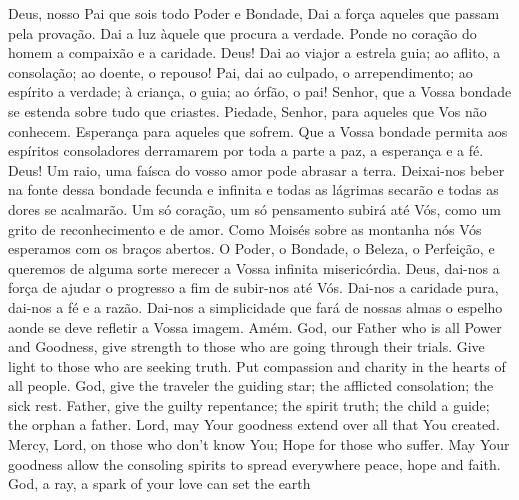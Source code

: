   \beginverse
    Deus, nosso Pai que sois todo Poder e Bondade, Dai
    a força aqueles que passam pela provação.
    \parspace
    Dai a luz àquele que procura a verdade.
    \parspace
    Ponde no coração do homem a compaixão e a caridade.
    \parspace
    Deus! Dai ao viajor a estrela guia; ao aflito,
    a consolação; ao doente, o repouso!
    \parspace
    Pai, dai ao culpado, o arrependimento; ao espírito
    a verdade; à criança, o guia; ao órfão, o pai!
    \parspace
    Senhor, que a Vossa bondade se estenda sobre tudo
    que criastes.
    \parspace
    Piedade, Senhor, para aqueles que Vos não conhecem.
    \parspace
    Esperança para aqueles que sofrem.
    \parspace
    Que a Vossa bondade permita aos espíritos
    consoladores derramarem por toda a parte a paz, a
    esperança e a fé.
    \parspace
    Deus! Um raio, uma faísca do vosso amor pode abrasar
    a terra.
    \parspace
    Deixai-nos beber na fonte dessa bondade fecunda
    e infinita e todas as lágrimas secarão e todas as
    dores se acalmarão.
    \parspace
    Um só coração, um só pensamento subirá até Vós,
    como um grito de reconhecimento e de amor.
    \parspace
    Como Moisés sobre as montanha nós Vós esperamos
    com os braços abertos.
    \parspace
    O Poder, o Bondade, o Beleza, o Perfeição, e
    queremos de alguma sorte merecer a Vossa infinita
    misericórdia.
    \parspace
    Deus, dai-nos a força de ajudar o progresso a fim
    de subir-nos até Vós.
    \parspace
    Dai-nos a caridade pura, dai-nos a fé e a razão.
    \parspace
    Dai-nos a simplicidade que fará de nossas almas o
    espelho aonde se deve refletir a Vossa imagem.
    \parspace
    Amém.
  \endverse
  \beginverse
    God, our Father who is all Power and Goodness,
    give strength to those who are going through
    their trials.
    \parspace
    Give light to those who are seeking truth.
    \parspace
    Put compassion and charity in the hearts of all
    people.
    \parspace
    God, give the traveler the guiding star; the
    afflicted consolation; the sick rest.
    \parspace
    Father, give the guilty repentance; the spirit
    truth; the child a guide; the orphan a father.
    \parspace
    Lord, may Your goodness extend over all that You
    created.
    \parspace
    Mercy, Lord, on those who don't know You; Hope
    for those who suffer.
    \parspace
    May Your goodness allow the consoling spirits to
    spread everywhere peace, hope and faith.
    \parspace
    God, a ray, a spark of your love can set the earth
